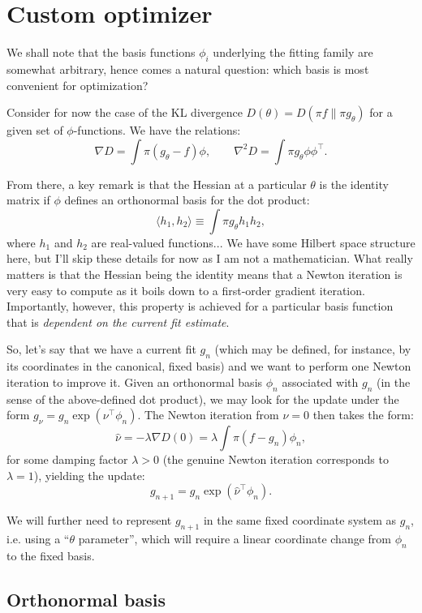 \documentclass{article}
\begin{document}
\section{Custom optimizer}

We shall note that the basis functions $\phi_i$ underlying the fitting family are somewhat arbitrary, hence comes a natural question: which basis is most convenient for optimization?

Consider for now the case of the KL divergence $D(\theta)=D(\pi f\|\pi g_\theta)$ for a given set of $\phi$-functions. We have the relations:
$$
\nabla D = \int \pi (g_\theta-f) \phi,
\qquad
\nabla^2 D = \int \pi g_\theta \phi\phi^\top.
$$

From there, a key remark is that the Hessian at a particular $\theta$ is the identity matrix if $\phi$ defines an orthonormal basis for the dot product:
$$
\langle h_1, h_2 \rangle \equiv \int \pi g_{\theta} h_1 h_2,
$$
where $h_1$ and $h_2$ are real-valued functions... We have some Hilbert space structure here, but I'll skip these details for now as I am not a mathematician. What really matters is that the Hessian being the identity means that a Newton iteration is very easy to compute as it boils down to a first-order gradient iteration. Importantly, however, this property is achieved for a particular basis function that is {\em dependent on the current fit estimate}.

So, let's say that we have a current fit $g_n$ (which may be defined, for instance, by its coordinates in the canonical, fixed basis) and we want to perform one Newton iteration to improve it. Given an orthonormal basis $\phi_n$ associated with $g_n$ (in the sense of the above-defined dot product), we may look for the update under the form $g_\nu = g_n \exp({\nu^\top \phi_n})$. The Newton iteration from $\nu=0$ then takes the form:
$$
\hat{\nu} = -\lambda \nabla D(0) = \lambda \int \pi(f - g_n)\phi_n,
$$
for some damping factor $\lambda > 0$ (the genuine Newton iteration corresponds to $\lambda=1$), yielding the update:
$$
g_{n+1} = g_n \exp (\hat{\nu}^\top \phi_n).
$$

We will further need to represent $g_{n+1}$ in the same fixed coordinate system as $g_n$, i.e. using a ``$\theta$ parameter'', which will require a linear coordinate change from $\phi_n$ to the fixed basis. 



\subsection{Orthonormal basis}
\end{document}
